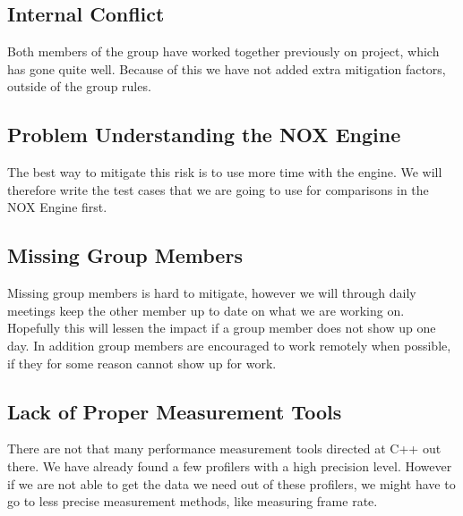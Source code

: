 \subsection*{Internal Conflict}
Both members of the group have worked together previously on project,
which has gone quite well. 
Because of this we have not added extra mitigation factors, 
outside of the group rules.

\subsection*{Problem Understanding the NOX Engine}
The best way to mitigate this risk is to use more time with the engine.
We will therefore write the test cases that we are
going to use for comparisons in the NOX Engine first.


\subsection*{Missing Group Members}
Missing group members is hard to mitigate, however 
we will through daily meetings keep the other member
up to date on what we are working on. 
Hopefully this will lessen the impact if a group member
does not show up one day.
In addition group members are encouraged to work remotely when possible,
if they for some reason cannot show up for work.

\subsection*{Lack of Proper Measurement Tools}
There are not that many performance measurement tools
directed at C++ out there. 
We have already found a few profilers with a high precision level. 
However if we are not able to get the data we need out of these profilers,
we might have to go to less precise measurement methods,
like measuring frame rate.